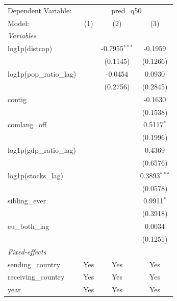 
\begingroup
\centering
\begin{tabular}{lccc}
   \tabularnewline \midrule \midrule
   Dependent Variable: & \multicolumn{3}{c}{pred\_q50}\\
   Model:                        & (1)     & (2)             & (3)\\  
   \midrule
   \emph{Variables}\\
   log1p(distcap)                &         & -0.7955$^{***}$ & -0.1959\\   
                                 &         & (0.1145)        & (0.1266)\\   
   log1p(pop\_ratio\_lag)        &         & -0.0454         & 0.0930\\   
                                 &         & (0.2756)        & (0.2845)\\   
   contig                        &         &                 & -0.1630\\   
                                 &         &                 & (0.1538)\\   
   comlang\_off                  &         &                 & 0.5117$^{*}$\\   
                                 &         &                 & (0.1996)\\   
   log1p(gdp\_ratio\_lag)        &         &                 & 0.4369\\   
                                 &         &                 & (0.6576)\\   
   log1p(stocks\_lag)            &         &                 & 0.3893$^{***}$\\   
                                 &         &                 & (0.0578)\\   
   sibling\_ever                 &         &                 & 0.9911$^{*}$\\   
                                 &         &                 & (0.3918)\\   
   eu\_both\_lag                 &         &                 & 0.0034\\   
                                 &         &                 & (0.1251)\\   
   \midrule
   \emph{Fixed-effects}\\
   sending\_country              & Yes     & Yes             & Yes\\  
   receiving\_country            & Yes     & Yes             & Yes\\  
   year                          & Yes     & Yes             & Yes\\  

\end{tabular}
